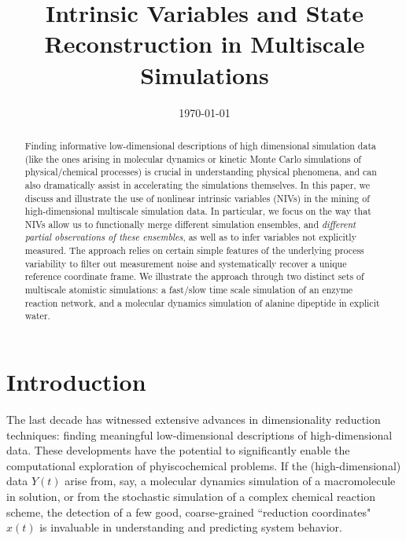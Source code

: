 \documentclass[aip,jcp,reprint,twocolumn]{revtex4-1}
\begin{document}
\title{Intrinsic Variables and State Reconstruction in Multiscale Simulations}


\date{\today}

\begin{abstract}
Finding informative low-dimensional descriptions of high dimensional simulation data
(like the ones arising in molecular dynamics or kinetic Monte Carlo simulations of
physical/chemical processes) is crucial in understanding physical phenomena, and can
also dramatically assist in accelerating the simulations themselves.
%
In this paper, we discuss and illustrate the use of nonlinear intrinsic variables (NIVs)
in the mining of high-dimensional multiscale simulation data.
%
In particular, we focus on the way that NIVs allow us to functionally merge different
simulation ensembles, and {\em different partial observations of these ensembles}, as well
as to infer variables not explicitly measured.
%
The approach relies on certain simple features of the underlying process variability to
filter out measurement noise and systematically recover a unique reference coordinate frame.
%
We illustrate the approach through two distinct sets of multiscale atomistic simulations: a fast/slow
time scale simulation of an enzyme reaction network, and a molecular
dynamics simulation of alanine dipeptide in explicit water.

\end{abstract}


\maketitle

\section{Introduction}
The last decade has witnessed extensive advances in dimensionality reduction techniques:
finding meaningful low-dimensional descriptions of high-dimensional data.
%
These developments have the potential to significantly enable the computational exploration
of phyiscochemical problems.
%
If the (high-dimensional) data $Y(t)$ arise from, say, a
molecular dynamics simulation of a macromolecule in solution, or from the stochastic
simulation of a complex chemical reaction scheme, the detection of a few good, coarse-grained
``reduction coordinates" $x(t)$ is invaluable in understanding and predicting system behavior.
\end{document}
